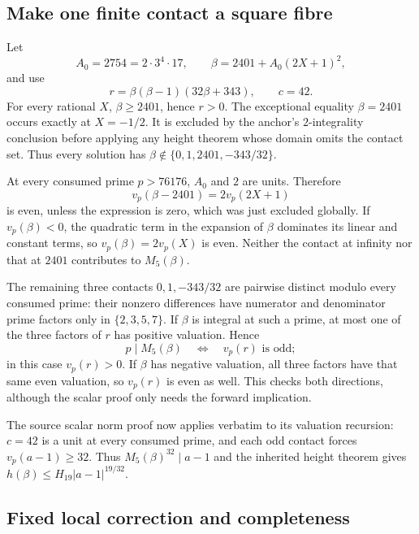 \subsection{Make one finite contact a square fibre}

Let
\[
 A_0=2754=2\cdot3^4\cdot17,\qquad
 \beta=2401+A_0(2X+1)^2,
\]
and use
\[
 r=\beta(\beta-1)(32\beta+343),\qquad c=42.
\]
For every rational $X$, $\beta\ge2401$, hence $r>0$.
The exceptional equality $\beta=2401$ occurs exactly at $X=-1/2$.
It is excluded by the anchor's $2$-integrality conclusion before applying
any height theorem whose domain omits the contact set. Thus every solution
has $\beta\notin\{0,1,2401,-343/32\}$.

At every consumed prime $p>76176$, $A_0$ and $2$ are units. Therefore
\[
 v_p(\beta-2401)=2v_p(2X+1)
\]
is even, unless the expression is zero, which was just excluded globally.
If $v_p(\beta)<0$, the quadratic term in the expansion of $\beta$ dominates
its linear and constant terms, so $v_p(\beta)=2v_p(X)$ is even. Neither the
contact at infinity nor that at $2401$ contributes to $M_5(\beta)$.

The remaining three contacts $0,1,-343/32$ are pairwise distinct modulo
every consumed prime: their nonzero differences have numerator and
denominator prime factors only in $\{2,3,5,7\}$. If $\beta$ is integral
at such a prime, at most one of the three factors of $r$ has positive
valuation. Hence
\[
 p\mid M_5(\beta)\quad\Longleftrightarrow\quad v_p(r)\text{ is odd};
\]
in this case $v_p(r)>0$. If $\beta$ has negative valuation, all three
factors have that same even valuation, so $v_p(r)$ is even as well.
This checks both directions, although the scalar proof only needs the
forward implication.

The source scalar norm proof now applies verbatim to its valuation
recursion: $c=42$ is a unit at every consumed prime, and each odd contact
forces $v_p(a-1)\ge32$. Thus $M_5(\beta)^{32}\mid a-1$ and the inherited
height theorem gives $h(\beta)\le H_{19}|a-1|^{19/32}$.

\subsection{Fixed local correction and completeness}

